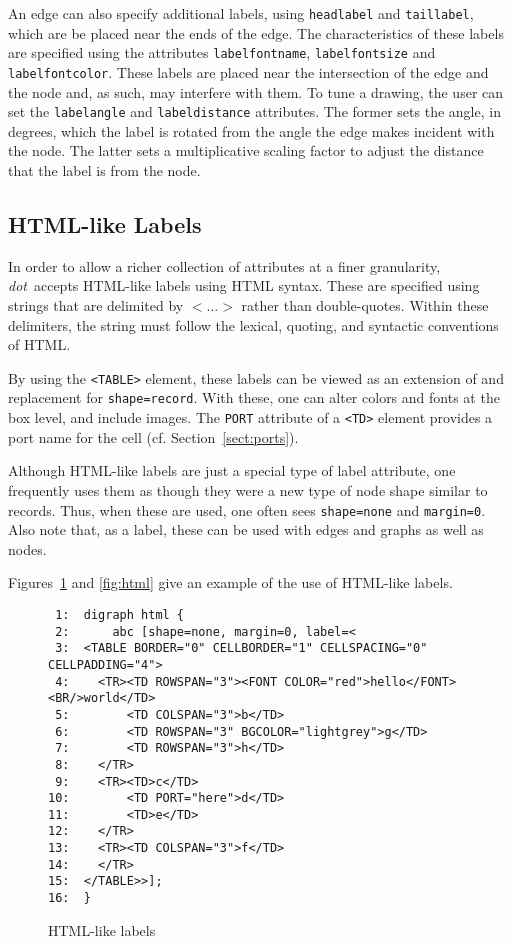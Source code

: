 \documentclass[11pt]{article}
\def\dot{{\it dot}}
\begin{document}
{An edge can also specify additional labels, using {\tt headlabel} and
{\tt taillabel}, which are be placed near the ends of the edge.
The characteristics of these labels are specified using the attributes
{\tt labelfontname}, {\tt labelfontsize} and {\tt labelfontcolor}.
These labels are placed near the intersection of the edge and the node
and, as such, may interfere with them. To tune a drawing, the user can
set the {\tt labelangle} and {\tt labeldistance} attributes.
The former sets the angle, in degrees, which the label is rotated from 
the angle the edge makes incident with the node.
The latter sets a multiplicative scaling factor to adjust the distance
that the label is from the node.



\subsection{HTML-like Labels}
\label{sect:html}
In order to allow a richer collection of attributes at a finer
granularity, \dot\ accepts HTML-like labels using HTML syntax.
These are specified using strings that are delimited by
$< \ldots >$ rather than double-quotes. Within these delimiters,
the string must follow the lexical, quoting, and syntactic 
conventions of HTML. 

By using the \verb"<TABLE>" element, these labels can be viewed
as an extension of and replacement for \verb"shape=record". With
these, one can alter colors and fonts at the box level, and include
images. 
The \verb"PORT" attribute of a \verb"<TD>" element
provides a port name for the cell (cf. Section~\ref{sect:ports}).

Although HTML-like labels are just a special type of label attribute,
one frequently uses them as though they were a new type of node
shape similar to records. Thus, when these are used, one often
sees \verb"shape=none" and \verb"margin=0". 
Also note that, as a label, these can be used with edges and
graphs as well as nodes.

Figures~\ref{fig:htmluse} and \ref{fig:html}
give an example of the use of HTML-like labels.

\begin{figure}[p]\footnotesize
\begin{verbatim}
 1:  digraph html {
 2:      abc [shape=none, margin=0, label=<
 3:  <TABLE BORDER="0" CELLBORDER="1" CELLSPACING="0" CELLPADDING="4">
 4:    <TR><TD ROWSPAN="3"><FONT COLOR="red">hello</FONT><BR/>world</TD>
 5:        <TD COLSPAN="3">b</TD>
 6:        <TD ROWSPAN="3" BGCOLOR="lightgrey">g</TD>
 7:        <TD ROWSPAN="3">h</TD>
 8:    </TR>
 9:    <TR><TD>c</TD>
10:        <TD PORT="here">d</TD>
11:        <TD>e</TD>
12:    </TR>
13:    <TR><TD COLSPAN="3">f</TD>
14:    </TR> 
15:  </TABLE>>]; 
16:  }
\end{verbatim}
\caption{HTML-like labels}
\label{fig:htmluse}
\end{figure}

}
\end{document}
